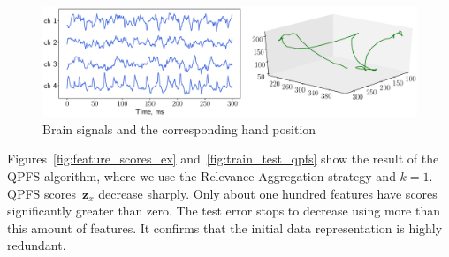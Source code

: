 \documentclass[12pt,twoside]{article}
\theoremstyle{definition}
\newcommand{\bz}{\mathbf{z}}
\begin{document}
\begin{figure}
	\centering
	\includegraphics[width=\linewidth]{figs/ecog_data}
	\caption{Brain signals and the corresponding hand position}
	\label{fig:ecog_data}
\end{figure}

Figures~\ref{fig:feature_scores_ex} and~\ref{fig:train_test_qpfs} show the result of the QPFS algorithm, where we use the Relevance Aggregation strategy and $k = 1$.
QPFS scores~$\bz_x$ decrease sharply.
Only about one hundred features have scores significantly greater than zero.
The test error stops to decrease using more than this amount of features.
It confirms that the initial data representation is highly redundant.
\end{document}
